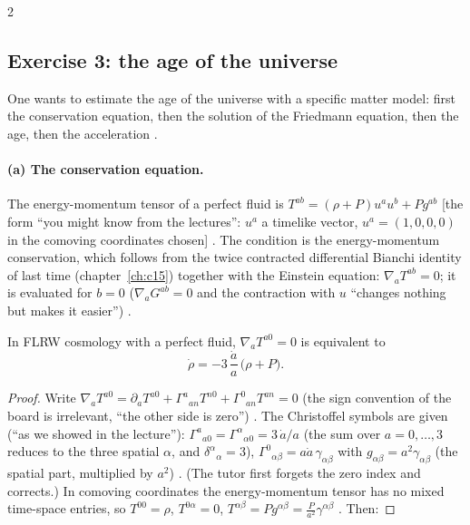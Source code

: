 \begin{paracol}{2}
\subsection*{Exercise 3: the age of the universe}

One wants to estimate the age of the universe with a specific matter model: first the conservation equation, then the solution of the Friedmann equation, then the age, then the acceleration .

\paragraph{(a) The conservation equation.} The energy-momentum tensor of a perfect fluid is $T^{ab}=(\rho+P)u^au^b+Pg^{ab}$ [the form ``you might know from the lectures'': $u^a$ a timelike vector, $u^a=(1,0,0,0)$ in the comoving coordinates chosen] . The condition is the energy-momentum conservation, which follows from the twice contracted differential Bianchi identity of last time (chapter~\ref{ch:c15}) together with the Einstein equation: $\nabla_aT^{ab}=0$; it is evaluated for $b=0$ ($\nabla_aG^{ab}=0$ and the contraction with $u$ ``changes nothing but makes it easier'') .
\begin{proposition}\label{prop:c21-conservation}
In FLRW cosmology with a perfect fluid, $\nabla_aT^{a0}=0$ is equivalent to
\[
  \dot\rho=-3\,\frac{\dot a}{a}\,\bigl(\rho+P\bigr).
\]
\end{proposition}
\begin{proof}
Write $\nabla_aT^{a0}=\partial_aT^{a0}+\Gamma^a{}_{an}T^{n0}+\Gamma^0{}_{an}T^{an}=0$ (the sign convention of the board is irrelevant, ``the other side is zero'') . The Christoffel symbols are given (``as we showed in the lecture''): $\Gamma^a{}_{a0}=\Gamma^\alpha{}_{\alpha0}=3\,\dot a/a$ (the sum over $a=0,\dots,3$ reduces to the three spatial $\alpha$, and $\delta^\alpha{}_\alpha=3$), $\Gamma^0{}_{\alpha\beta}=a\dot a\,\gamma_{\alpha\beta}$ with $g_{\alpha\beta}=a^2\gamma_{\alpha\beta}$ (the spatial part, multiplied by $a^2$) . (The tutor first forgets the zero index and corrects.) In comoving coordinates the energy-momentum tensor has no mixed time-space entries, so $T^{00}=\rho$, $T^{0\alpha}=0$, $T^{\alpha\beta}=Pg^{\alpha\beta}=\frac P{a^2}\gamma^{\alpha\beta}$ . Then:

\end{proof}
\end{paracol}
